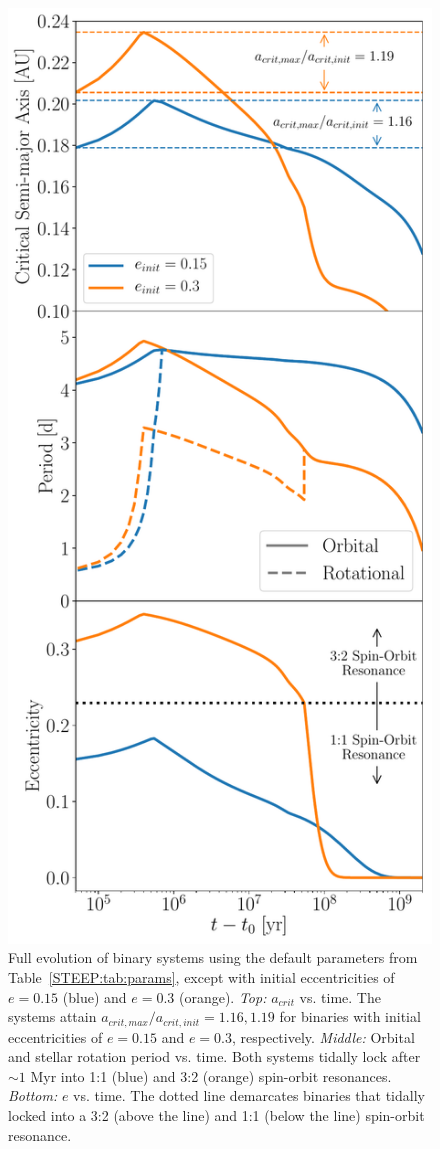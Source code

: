 \begin{figure}
	\includegraphics[scale=0.5]{ecc_comp.pdf}
   \caption{Full evolution of binary systems using the default parameters from Table~\ref{STEEP:tab:params}, except with initial eccentricities of $e = 0.15$ (blue) and $e = 0.3$ (orange).  {\it Top:} $a_{crit}$ vs. time.  The systems attain $a_{crit,max}/a_{crit,init} = 1.16, 1.19$ for binaries with initial eccentricities of $e = 0.15$ and $e = 0.3$, respectively. {\it Middle:} Orbital and stellar rotation period vs. time.  Both systems tidally lock after ${\sim}1$ Myr into 1:1 (blue) and 3:2 (orange) spin-orbit resonances.  {\it Bottom:} $e$ vs. time.  The dotted line demarcates binaries that tidally locked into a 3:2 (above the line) and 1:1 (below the line) spin-orbit resonance.}
    \label{STEEP:fig:ecc_comp}
\end{figure}

